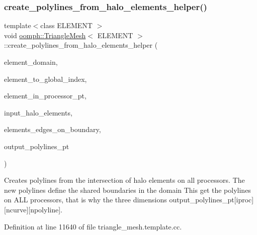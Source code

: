 \subsubsection{\texorpdfstring{create\+\_\+polylines\+\_\+from\+\_\+halo\+\_\+elements\+\_\+helper()}{create\_polylines\_from\_halo\_elements\_helper()}}
{\footnotesize\ttfamily template$<$class E\+L\+E\+M\+E\+NT $>$ \\
void \hyperlink{classoomph_1_1TriangleMesh}{oomph\+::\+Triangle\+Mesh}$<$ E\+L\+E\+M\+E\+NT $>$\+::create\+\_\+polylines\+\_\+from\+\_\+halo\+\_\+elements\+\_\+helper (\begin{DoxyParamCaption}\item[{const Vector$<$ unsigned $>$ \&}]{element\+\_\+domain,  }\item[{std\+::map$<$ Generalised\+Element $\ast$, unsigned $>$ \&}]{element\+\_\+to\+\_\+global\+\_\+index,  }\item[{std\+::set$<$ Finite\+Element $\ast$$>$ \&}]{element\+\_\+in\+\_\+processor\+\_\+pt,  }\item[{Vector$<$ Vector$<$ Vector$<$ Generalised\+Element $\ast$$>$ $>$ $>$ \&}]{input\+\_\+halo\+\_\+elements,  }\item[{std\+::map$<$ std\+::pair$<$ Node $\ast$, Node $\ast$$>$, unsigned $>$ \&}]{elements\+\_\+edges\+\_\+on\+\_\+boundary,  }\item[{Vector$<$ Vector$<$ Vector$<$ Triangle\+Mesh\+Poly\+Line $\ast$$>$ $>$ $>$ \&}]{output\+\_\+polylines\+\_\+pt }\end{DoxyParamCaption})\hspace{0.3cm}{\ttfamily [protected]}}



Creates polylines from the intersection of halo elements on all processors. The new polylines define the shared boundaries in the domain This get the polylines on A\+LL processors, that is why the three dimensions output\+\_\+polylines\+\_\+pt\mbox{[}iproc\mbox{]}\mbox{[}ncurve\mbox{]}\mbox{[}npolyline\mbox{]}. 



Definition at line 11640 of file triangle\+\_\+mesh.\+template.\+cc.

\mbox{\label{classoomph_1_1TriangleMesh_a2e26905533350a8cc0e47ed3260054e2}} 
